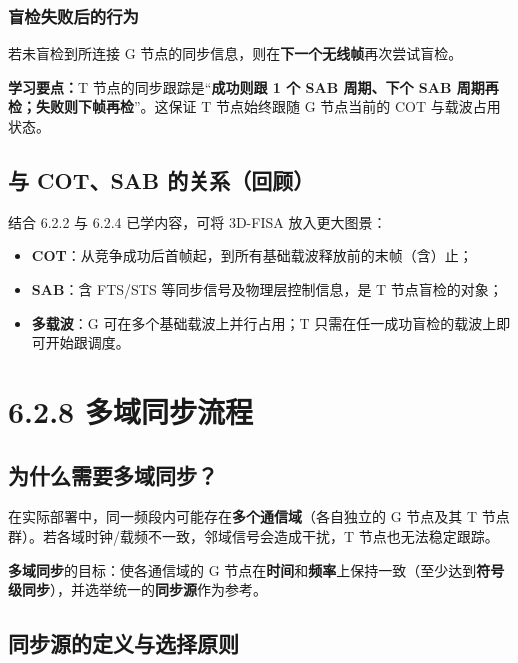 \documentclass[11pt,a4paper]{ctexart}
\newcommand{\learn}[1]{\par\noindent\textcolor{blue!70!black}{\textbf{学习要点：}#1}\par}
\begin{document}
\subsubsection{盲检失败后的行为}

若未盲检到所连接 G 节点的同步信息，则在\textbf{下一个无线帧}再次尝试盲检。

\learn{T 节点的同步跟踪是“\textbf{成功则跟 1 个 SAB 周期、下个 SAB 周期再检；失败则下帧再检}”。这保证 T 节点始终跟随 G 节点当前的 COT 与载波占用状态。}

\subsection{与 COT、SAB 的关系（回顾）}

结合 6.2.2 与 6.2.4 已学内容，可将 3D-FISA 放入更大图景：

\begin{itemize}
  \item \textbf{COT}：从竞争成功后首帧起，到所有基础载波释放前的末帧（含）止；
  \item \textbf{SAB}：含 FTS/STS 等同步信号及物理层控制信息，是 T 节点盲检的对象；
  \item \textbf{多载波}：G 可在多个基础载波上并行占用；T 只需在任一成功盲检的载波上即可开始跟调度。
\end{itemize}

\newpage
\section{6.2.8 多域同步流程}

\subsection{为什么需要多域同步？}

在实际部署中，同一频段内可能存在\textbf{多个通信域}（各自独立的 G 节点及其 T 节点群）。若各域时钟/载频不一致，邻域信号会造成干扰，T 节点也无法稳定跟踪。

\textbf{多域同步}的目标：使各通信域的 G 节点在\textbf{时间}和\textbf{频率}上保持一致（至少达到\textbf{符号级同步}），并选举统一的\textbf{同步源}作为参考。

\subsection{同步源的定义与选择原则}
\end{document}

